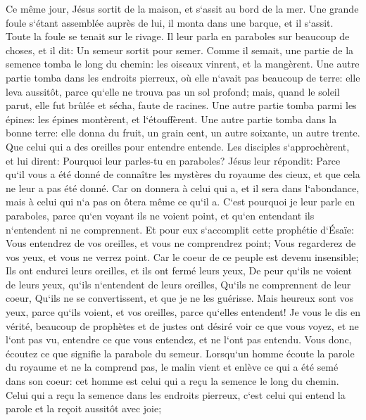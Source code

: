 \verse Ce même jour, Jésus sortit de la maison, et s`assit au bord de la mer. 
\verse Une grande foule s`étant assemblée auprès de lui, il monta dans une barque, et il s`assit. Toute la foule se tenait sur le rivage. 
\verse Il leur parla en paraboles sur beaucoup de choses, et il dit: 
\verse Un semeur sortit pour semer. Comme il semait, une partie de la semence tomba le long du chemin: les oiseaux vinrent, et la mangèrent. 
\verse Une autre partie tomba dans les endroits pierreux, où elle n`avait pas beaucoup de terre: elle leva aussitôt, parce qu`elle ne trouva pas un sol profond; 
\verse mais, quand le soleil parut, elle fut brûlée et sécha, faute de racines. 
\verse Une autre partie tomba parmi les épines: les épines montèrent, et l`étouffèrent. 
\verse Une autre partie tomba dans la bonne terre: elle donna du fruit, un grain cent, un autre soixante, un autre trente. 
\verse Que celui qui a des oreilles pour entendre entende. 
\verse Les disciples s`approchèrent, et lui dirent: Pourquoi leur parles-tu en paraboles? 
\verse Jésus leur répondit: Parce qu`il vous a été donné de connaître les mystères du royaume des cieux, et que cela ne leur a pas été donné. 
\verse Car on donnera à celui qui a, et il sera dans l`abondance, mais à celui qui n`a pas on ôtera même ce qu`il a. 
\verse C`est pourquoi je leur parle en paraboles, parce qu`en voyant ils ne voient point, et qu`en entendant ils n`entendent ni ne comprennent. 
\verse Et pour eux s`accomplit cette prophétie d`Ésaïe: Vous entendrez de vos oreilles, et vous ne comprendrez point; Vous regarderez de vos yeux, et vous ne verrez point. 
\verse Car le coeur de ce peuple est devenu insensible; Ils ont endurci leurs oreilles, et ils ont fermé leurs yeux, De peur qu`ils ne voient de leurs yeux, qu`ils n`entendent de leurs oreilles, Qu`ils ne comprennent de leur coeur, Qu`ils ne se convertissent, et que je ne les guérisse. 
\verse Mais heureux sont vos yeux, parce qu`ils voient, et vos oreilles, parce qu`elles entendent! 
\verse Je vous le dis en vérité, beaucoup de prophètes et de justes ont désiré voir ce que vous voyez, et ne l`ont pas vu, entendre ce que vous entendez, et ne l`ont pas entendu. 
\verse Vous donc, écoutez ce que signifie la parabole du semeur. 
\verse Lorsqu`un homme écoute la parole du royaume et ne la comprend pas, le malin vient et enlève ce qui a été semé dans son coeur: cet homme est celui qui a reçu la semence le long du chemin. 
\verse Celui qui a reçu la semence dans les endroits pierreux, c`est celui qui entend la parole et la reçoit aussitôt avec joie; 

